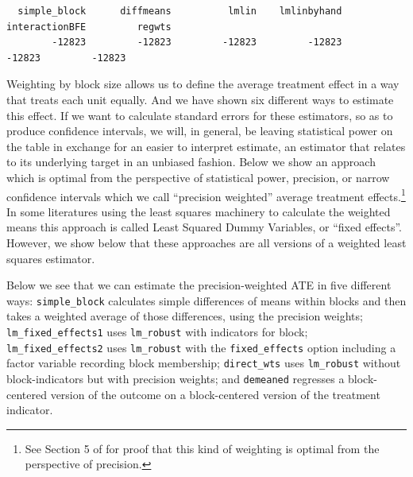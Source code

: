\documentclass[
  12pt,
]{book}
\newenvironment{Shaded}{\begin{snugshade}}{\end{snugshade}}
\newcommand{\CommentTok}[1]{\textcolor[rgb]{0.56,0.35,0.01}{\textit{#1}}}
\theoremstyle{definition}
\theoremstyle{definition}
\theoremstyle{definition}
\theoremstyle{remark}
\begin{document}
\begin{verbatim}
  simple_block      diffmeans          lmlin    lmlinbyhand interactionBFE         regwts 
        -12823         -12823         -12823         -12823         -12823         -12823 
\end{verbatim}

\begin{Shaded}
\end{Shaded}

Weighting by block size allows us to define the average treatment effect
in a way that treats each unit equally. And we have shown six different
ways to estimate this effect. If we want to calculate standard errors
for these estimators, so as to produce confidence intervals, we will, in
general, be leaving statistical power on the table in exchange for an
easier to interpret estimate, an estimator that relates to its
underlying target in an unbiased fashion. Below we show an approach
which is optimal from the perspective of statistical power, precision,
or narrow confidence intervals which we call ``precision weighted''
average treatment effects.\footnote{See Section 5 of
  \citet{hansen_covariate_2008} for proof that this kind of weighting is
  optimal from the perspective of precision.} In some literatures using
the least squares machinery to calculate the weighted means this
approach is called Least Squared Dummy Variables, or ``fixed effects''.
However, we show below that these approaches are all versions of a
weighted least squares estimator.

Below we see that we can estimate the precision-weighted ATE in five
different ways: \texttt{simple\_block} calculates simple differences of
means within blocks and then takes a weighted average of those
differences, using the precision weights; \texttt{lm\_fixed\_effects1}
uses \texttt{lm\_robust} with indicators for block;
\texttt{lm\_fixed\_effects2} uses \texttt{lm\_robust} with the
\texttt{fixed\_effects} option including a factor variable recording
block membership; \texttt{direct\_wts} uses \texttt{lm\_robust} without
block-indicators but with precision weights; and \texttt{demeaned}
regresses a block-centered version of the outcome on a block-centered
version of the treatment indicator.
\end{document}
